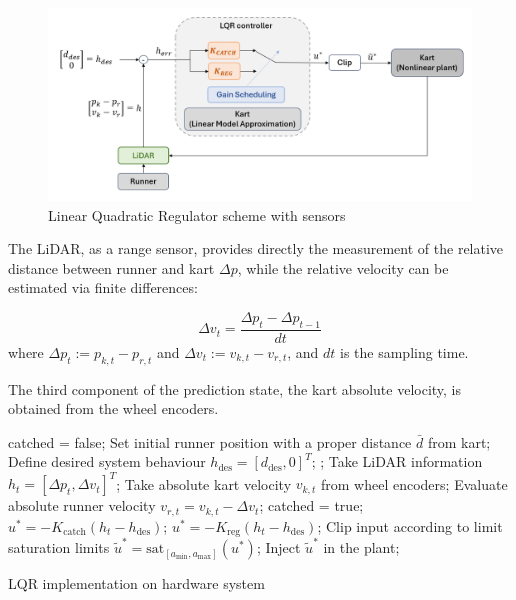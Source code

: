 \documentclass[a4paper,12pt,oneside]{book}
\begin{document}
\begin{figure}
	\centering
	\includegraphics[width=1.0\textwidth]{LQR_hard_scheme.png}
	\caption{Linear Quadratic Regulator scheme with sensors}
	\label{image:LQR_hard_scheme}
\end{figure}

The LiDAR, as a range sensor, provides directly the measurement of the relative distance between runner and kart $\Delta p$, while the relative velocity can be estimated via finite differences:

\begin{equation}
	\Delta v_t = \frac{\Delta p_t - \Delta p_{t-1}} {dt}
\end{equation}
where $\Delta p_t := p_{k,t} - p_{r,t}$ and $\Delta v_t := v_{k,t} - v_ {r,t}$, and $dt$ is the sampling time.

The third component of the prediction state, the kart absolute velocity, is obtained from the wheel encoders.

\begin{algorithm}
\begin{algorithmic}[1]
	\State catched = false;
	\State Set initial runner position with a proper distance $\bar{d}$ from kart;
	\State Define desired system behaviour  $h_{\text{des}} = [d_{\text{des}}, 0]^T$;
	;
		\State Take LiDAR information $h_t = [\Delta p_t, \Delta v_t]^T$;
		\State Take absolute kart velocity $v_{k,t}$ from wheel encoders;
		\State Evaluate absolute runner velocity $v_{r,t} = v_{k,t} - \Delta v_t $;
			\State catched = true;
		\EndIf
			\State $u^* = - K_{\text{catch}} (h_t - h_{\text{des}}) $;
		\Else 
			\State $u^* = - K_{\text{reg}} (h_t - h_{\text{des}}) $;
		\EndIf
		\State Clip input according to limit saturation limits $\tilde{u}^* = \text{sat}_{[a_{\min}, a_{\max}]} (u^*)$;
		\State Inject $\tilde{u}^*$ in the plant;
	\EndFor
\caption{LQR implementation on hardware system}
\label{alg:LQR_hard_implementation}
\end{algorithmic}
\end{algorithm}
\end{document}
